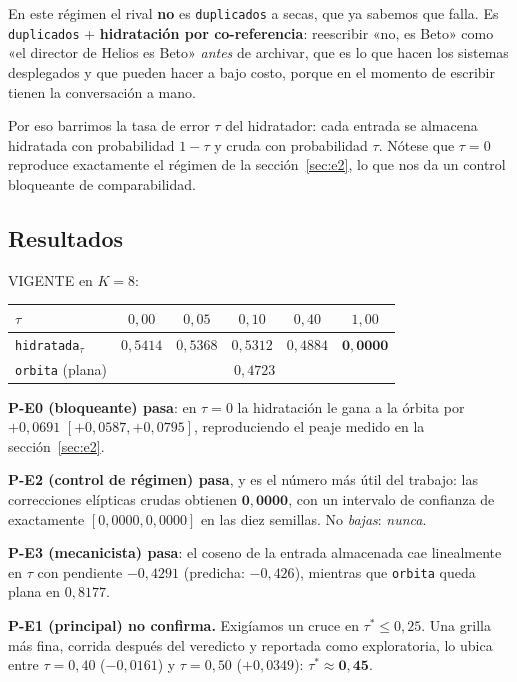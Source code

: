 \documentclass[11pt,a4paper]{article}
\begin{document}
En este régimen el rival \textbf{no} es \texttt{duplicados} a secas, que ya sabemos que falla. Es
\texttt{duplicados} + \textbf{hidratación por co-referencia}: reescribir «no, es Beto» como «el
director de Helios es Beto» \emph{antes} de archivar, que es lo que hacen los sistemas desplegados y
que pueden hacer a bajo costo, porque en el momento de escribir tienen la conversación a mano.

Por eso barrimos la tasa de error $\tau$ del hidratador: cada entrada se almacena hidratada con
probabilidad $1-\tau$ y cruda con probabilidad $\tau$. Nótese que $\tau = 0$ reproduce exactamente el
régimen de la sección~\ref{sec:e2}, lo que nos da un control bloqueante de comparabilidad.

\subsection{Resultados}

VIGENTE en $K=8$:

\begin{center}
\begin{tabular}{lccccc}
\toprule
$\tau$ & $0{,}00$ & $0{,}05$ & $0{,}10$ & $0{,}40$ & $1{,}00$ \\
\midrule
\texttt{hidratada}$_\tau$ & $0{,}5414$ & $0{,}5368$ & $0{,}5312$ & $0{,}4884$ & $\mathbf{0{,}0000}$ \\
\texttt{orbita} (plana)   & \multicolumn{5}{c}{$0{,}4723$} \\
\bottomrule
\end{tabular}
\end{center}

\textbf{P-E0 (bloqueante) pasa}: en $\tau=0$ la hidratación le gana a la órbita por $+0{,}0691$
$[+0{,}0587, +0{,}0795]$, reproduciendo el peaje medido en la sección~\ref{sec:e2}.

\textbf{P-E2 (control de régimen) pasa}, y es el número más útil del trabajo: las correcciones
elípticas crudas obtienen $\mathbf{0{,}0000}$, con un intervalo de confianza de exactamente
$[0{,}0000, 0{,}0000]$ en las diez semillas. No \emph{bajas}: \emph{nunca}.

\textbf{P-E3 (mecanicista) pasa}: el coseno de la entrada almacenada cae linealmente en $\tau$ con
pendiente $-0{,}4291$ (predicha: $-0{,}426$), mientras que \texttt{orbita} queda plana en $0{,}8177$.

\textbf{P-E1 (principal) no confirma.} Exigíamos un cruce en $\tau^{*} \leq 0{,}25$. Una grilla más
fina, corrida después del veredicto y reportada como exploratoria, lo ubica entre $\tau = 0{,}40$
($-0{,}0161$) y $\tau = 0{,}50$ ($+0{,}0349$): $\tau^{*} \approx \mathbf{0{,}45}$.
\end{document}
